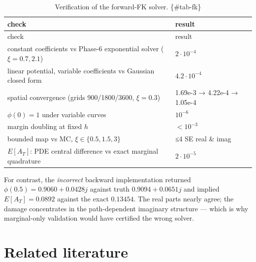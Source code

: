 \documentclass[
  english,
  10pt,
  letterpaper,
  DIV=11,
  numbers=noendperiod]{scrartcl}
\begin{document}
\begin{longtable}[]{@{}
  >{\raggedright\arraybackslash}p{}
  >{\raggedright\arraybackslash}p{}@{}}
\caption{Verification of the forward-FK solver.
\{\#tab-fk\}}\tabularnewline
\toprule\noalign{}
\begin{minipage}[b]{\linewidth}\raggedright
check
\end{minipage} & \begin{minipage}[b]{\linewidth}\raggedright
result
\end{minipage} \\
\midrule\noalign{}
\endfirsthead
\toprule\noalign{}
\begin{minipage}[b]{\linewidth}\raggedright
check
\end{minipage} & \begin{minipage}[b]{\linewidth}\raggedright
result
\end{minipage} \\
\midrule\noalign{}
\endhead
\bottomrule\noalign{}
\endlastfoot
constant coefficients vs Phase-6 exponential solver (\(\xi=0.7,2.1\)) &
\(2\cdot10^{-4}\) \\
linear potential, variable coefficients vs Gaussian closed form &
\(4.2\cdot10^{-4}\) \\
spatial convergence (grids 900/1800/3600, \(\xi=0.3\)) & 1.69e-3 →
4.22e-4 → 1.05e-4 \\
\(\phi(0)=1\) under variable curves & \(10^{-6}\) \\
margin doubling at fixed \(h\) & \(<10^{-3}\) \\
bounded map vs MC, \(\xi\in\{0.5,1.5,3\}\) & ≤4 SE real \& imag \\
\(E[A_T]\): PDE central difference vs exact marginal quadrature &
\(2\cdot10^{-5}\) \\
\end{longtable}

For contrast, the \emph{incorrect} backward implementation returned
\(\phi(0.5)=0.9060+0.0428j\) against truth \(0.9094+0.0651j\) and
implied \(E[A_T]=0.0892\) against the exact \(0.13454\). The real parts
nearly agree; the damage concentrates in the path-dependent imaginary
structure --- which is why marginal-only validation would have certified
the wrong solver.

\section{Related literature}\label{sec-related}
\end{document}
